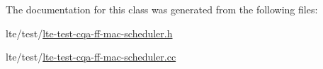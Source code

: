 The documentation for this class was generated from the following files\+:\begin{DoxyCompactItemize}
\item 
lte/test/\hyperlink{lte-test-cqa-ff-mac-scheduler_8h}{lte-\/test-\/cqa-\/ff-\/mac-\/scheduler.\+h}\item 
lte/test/\hyperlink{lte-test-cqa-ff-mac-scheduler_8cc}{lte-\/test-\/cqa-\/ff-\/mac-\/scheduler.\+cc}\end{DoxyCompactItemize}

